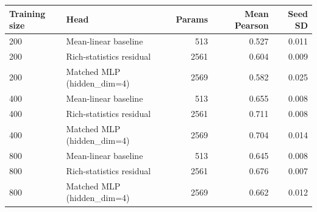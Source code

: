 \begin{tabular}{llrrr}
\toprule
Training size & Head & Params & Mean Pearson & Seed SD \\
\midrule
200 & Mean-linear baseline & 513 & 0.527 & 0.011 \\
200 & Rich-statistics residual & 2561 & 0.604 & 0.009 \\
200 & Matched MLP (hidden\_dim=4) & 2569 & 0.582 & 0.025 \\
400 & Mean-linear baseline & 513 & 0.655 & 0.008 \\
400 & Rich-statistics residual & 2561 & 0.711 & 0.008 \\
400 & Matched MLP (hidden\_dim=4) & 2569 & 0.704 & 0.014 \\
800 & Mean-linear baseline & 513 & 0.645 & 0.008 \\
800 & Rich-statistics residual & 2561 & 0.676 & 0.007 \\
800 & Matched MLP (hidden\_dim=4) & 2569 & 0.662 & 0.012 \\
\bottomrule
\end{tabular}
